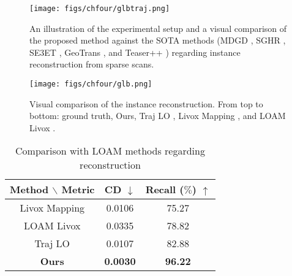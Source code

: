 \begin{figure}[H] 
	\centering
\texttt{[image: figs/chfour/glbtraj.png]}
	\caption{An illustration of the experimental setup and a visual comparison of the proposed method against the SOTA methods (MDGD \cite{mdgd}, SGHR \cite{sghr}, SE3ET \cite{se3et}, GeoTrans \cite{geotransformer}, and Teaser++ \cite{teaser}) regarding instance reconstruction from sparse scans.}
	\label{glbtraj}
\end{figure}
%
\par
\begin{figure}[H] 
	\centering
\texttt{[image: figs/chfour/glb.png]}
	\caption{Visual comparison of the instance reconstruction. From top to bottom: ground truth, Ours, Traj LO \cite{traj}, Livox Mapping \cite{sdk}, and LOAM Livox \cite{lloam}.}
	\label{glb}
\end{figure}

\begin{table}[ht]
\caption{Comparison with LOAM methods regarding reconstruction }
	\centering
		\begin{tabular}{c|c|c}
			\hline\hline
				Method $\backslash$ Metric & CD $\downarrow$ & Recall ($\%$) $\uparrow$ \\ \hline
   Livox Mapping \cite{sdk} & 0.0106 & 75.27 \\ \hline
   LOAM Livox \cite{lloam} & 0.0335 & 78.82  \\ \hline
   Traj LO \cite{traj} & 0.0107 & 82.88  \\ \hline
   \textbf{Ours}  & \textbf{0.0030} & \textbf{96.22}
\\ \hline  \hline	
		\end{tabular}
		\label{tabglb}
\end{table}



